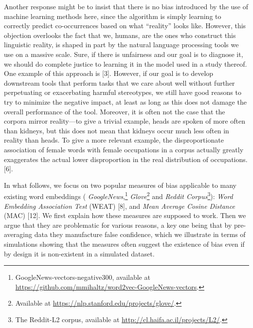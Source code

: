 \documentclass[
  10pt,
  dvipsnames,enabledeprecatedfontcommands]{scrartcl}
\begin{document}
Another response might be to insist that there is no bias introduced by
the use of machine learning methods here, since the algorithm is simply
learning to correctly predict co-occurrences based on what ``reality''
looks like. However, this objection overlooks the fact that we, humans,
are the ones who construct this linguistic reality, is shaped in part by
the natural language processing tools we use on a massive scale. Sure,
if there is unfairness and our goal is to diagnose it, we should do
complete justice to learning it in the model used in a study thereof.
One example of this approach is {[}3{]}. However, if our goal is to
develop downstream tools that perform tasks that we care about well
without further perpetuating or exacerbating harmful stereotypes, we
still have good reasons to try to minimize the negative impact, at least
as long as this does not damage the overall performance of the tool.
Moreover, it is often not the case that the corpora mirror reality---to
give a trivial example, heads are spoken of more often than kidneys, but
this does not mean that kidneys occur much less often in reality than
heads. To give a more relevant example, the disproportionate association
of female words with female occupations in a corpus actually greatly
exaggerates the actual lower disproportion in the real distribution of
occupations. {[}6{]}.

In what follows, we focus on two popular measures of bias applicable to
many existing word embeddings (
\emph{GoogleNews},\footnote{GoogleNews-vectors-negative300, available at  \url{https://github.com/mmihaltz/word2vec-GoogleNews-vectors}.}
\emph{Glove}\footnote{Available at \url{https://nlp.stanford.edu/projects/glove/}.}
and
\emph{Reddit Corpus}\footnote{The Reddit-L2 corpus, available at  \url{http://cl.haifa.ac.il/projects/L2/}.}):
\emph{Word Embedding Association Test} (WEAT) {[}8{]}, and
\emph{Mean Average Cosine Distance} (MAC) {[}12{]}. We first explain how
these measures are supposed to work. Then we argue that they are
problematic for various reasons, a key one being that by pre-averaging
data they manufacture false confidence, which we illustrate in terms of
simulations showing that the measures often suggest the existence of
bias even if by design it is non-existent in a simulated dataset.
\end{document}
